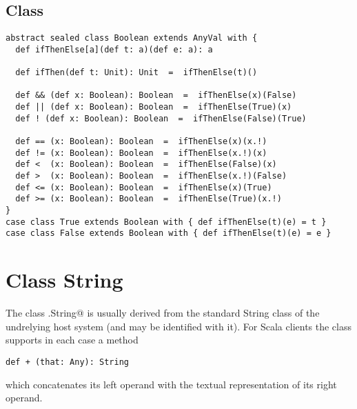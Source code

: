 \documentclass[a4paper,12pt,twoside,titlepage]{book}
\begin{document}
\subsection{Class }
\label{sec:cls-boolean}

\begin{lstlisting}
abstract sealed class Boolean extends AnyVal with {
  def ifThenElse[a](def t: a)(def e: a): a

  def ifThen(def t: Unit): Unit  =  ifThenElse(t)()

  def && (def x: Boolean): Boolean  =  ifThenElse(x)(False)
  def || (def x: Boolean): Boolean  =  ifThenElse(True)(x)
  def ! (def x: Boolean): Boolean  =  ifThenElse(False)(True)

  def == (x: Boolean): Boolean  =  ifThenElse(x)(x.!)
  def != (x: Boolean): Boolean  =  ifThenElse(x.!)(x)
  def <  (x: Boolean): Boolean  =  ifThenElse(False)(x)
  def >  (x: Boolean): Boolean  =  ifThenElse(x.!)(False)
  def <= (x: Boolean): Boolean  =  ifThenElse(x)(True)
  def >= (x: Boolean): Boolean  =  ifThenElse(True)(x.!)
}
case class True extends Boolean with { def ifThenElse(t)(e) = t }
case class False extends Boolean with { def ifThenElse(t)(e) = e }
\end{lstlisting}

\section{Class String}

The class \verb@scala.String@ is usually derived from the standard
String class of the undrelying host system (and may be identified with
it). For Scala clients the class supports in each case a method
\begin{lstlisting}
def + (that: Any): String 
\end{lstlisting}
which concatenates its left operand with the textual representation of its
right operand.

\end{document}
